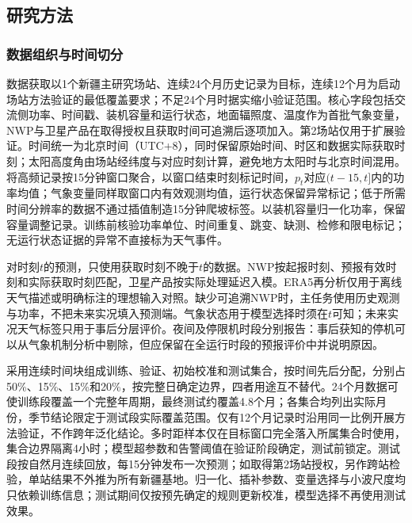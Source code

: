 \subsection{研究方法}
\subsubsection{数据组织与时间切分}
数据获取以1个新疆主研究场站、连续24个月历史记录为目标，连续12个月为启动场站方法验证的最低覆盖要求；不足24个月时据实缩小验证范围。核心字段包括交流侧功率、时间戳、装机容量和运行状态，地面辐照度、温度作为首批气象变量，NWP与卫星产品在取得授权且获取时间可追溯后逐项加入。第2场站仅用于扩展验证。时间统一为北京时间（UTC+8），同时保留原始时间、时区和数据实际获取时刻；太阳高度角由场站经纬度与对应时刻计算，避免地方太阳时与北京时间混用。将高频记录按15分钟窗口聚合，以窗口结束时刻标记时间，$p_t$对应$(t-15,t]$内的功率均值；气象变量同样取窗口内有效观测均值，运行状态保留异常标记；低于所需时间分辨率的数据不通过插值制造15分钟爬坡标签。以装机容量归一化功率，保留容量调整记录。训练前核验功率单位、时间重复、跳变、缺测、检修和限电标记；无运行状态证据的异常不直接标为天气事件。

对时刻$t$的预测，只使用获取时刻不晚于$t$的数据。NWP按起报时刻、预报有效时刻和实际获取时刻匹配，卫星产品按实际处理延迟入模。ERA5再分析仅用于离线天气描述或明确标注的理想输入对照。缺少可追溯NWP时，主任务使用历史观测与功率，不把未来实况填入预测端。气象状态用于模型选择时须在$t$可知；未来实况天气标签只用于事后分层评价。夜间及停限机时段分别报告：事后获知的停机可以从气象机制分析中剔除，但应保留在全运行时段的预报评价中并说明原因。

采用连续时间块组成训练、验证、初始校准和测试集合，按时间先后分配，分别占50\%、15\%、15\%和20\%，按完整日确定边界，四者用途互不替代。24个月数据可使训练段覆盖一个完整年周期，最终测试约覆盖4.8个月；各集合均列出实际月份，季节结论限定于测试段实际覆盖范围。仅有12个月记录时沿用同一比例开展方法验证，不作跨年泛化结论。多时距样本仅在目标窗口完全落入所属集合时使用，集合边界隔离4小时；模型超参数和告警阈值在验证阶段确定，测试前锁定。测试段按自然月连续回放，每15分钟发布一次预测；如取得第2场站授权，另作跨站检验，单站结果不外推为所有新疆基地。归一化、插补参数、变量选择与小波尺度均只依赖训练信息；测试期间仅按预先确定的规则更新校准，模型选择不再使用测试效果。


